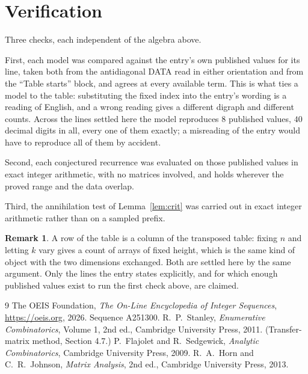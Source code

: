 \documentclass[11pt,a4paper]{article}
\theoremstyle{plain}
\theoremstyle{definition}
\newtheorem{remark}[theorem]{Remark}
\begin{document}
\section{Verification}

Three checks, each independent of the algebra above.

First, each model was compared against the entry's own published values for its line, taken
both from the antidiagonal DATA read in either orientation and from the ``Table starts''
block, and agrees at every available term. This is what ties a model to the table:
substituting the fixed index into the entry's wording is a reading of English, and a wrong
reading gives a different digraph and different counts. Across the lines settled here the
model reproduces $8$ published values, $40$ decimal digits in all, every one of
them exactly; a misreading of the entry would have to reproduce all of them by accident.

Second, each conjectured recurrence was evaluated on those published values in exact
integer arithmetic, with no matrices involved, and holds wherever the proved range and the
data overlap.

Third, the annihilation test of Lemma~\ref{lem:crit} was carried out in exact integer
arithmetic rather than on a sampled prefix.

\begin{remark}
A row of the table is a column of the transposed table: fixing $n$ and letting $k$ vary gives a
count of arrays of fixed height, which is the same kind of object with the two dimensions
exchanged. Both are settled here by the same argument. Only the lines the entry states
explicitly, and for which enough published values exist to run the first check above, are
claimed.
\end{remark}

\begin{thebibliography}{9}
 The OEIS Foundation, \emph{The On-Line Encyclopedia of Integer
Sequences}, \url{https://oeis.org}, 2026. Sequence A251300.
 R.~P.~Stanley, \emph{Enumerative Combinatorics}, Volume 1, 2nd ed.,
Cambridge University Press, 2011. (Transfer-matrix method, Section 4.7.)
 P.~Flajolet and R.~Sedgewick, \emph{Analytic Combinatorics}, Cambridge
University Press, 2009.
 R.~A.~Horn and C.~R.~Johnson, \emph{Matrix Analysis}, 2nd ed., Cambridge
University Press, 2013.
\end{thebibliography}
\end{document}
